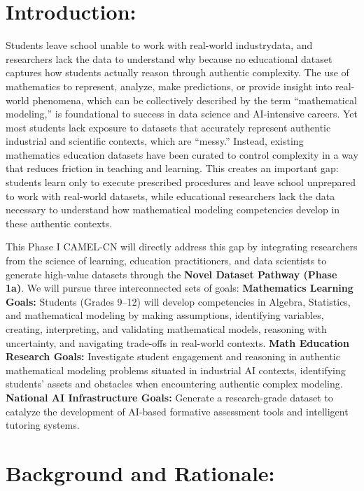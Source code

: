 \documentclass[11pt]{article}
\begin{document}
\section{Introduction:} 
Students leave school unable to work with real-world industrydata, and researchers lack the data to understand why because no educational dataset captures how students actually reason through authentic complexity.
The use of mathematics to represent, analyze, make predictions, or provide insight into real-world phenomena, which can be collectively described by the term ``mathematical modeling,'' is foundational to success in data science and AI-intensive careers.
Yet most students lack exposure to datasets that accurately represent authentic industrial and scientific contexts, which are ``messy.''
Instead, existing mathematics education datasets have been curated to control complexity in a way that reduces friction in teaching and learning.
This creates an important gap: students learn only to execute prescribed procedures and leave school unprepared to work with real-world datasets, while educational researchers lack the data necessary to understand how mathematical modeling competencies develop in these authentic contexts.

This Phase I CAMEL-CN will directly address this gap by integrating researchers from the science of learning, education practitioners, and data scientists to generate high-value datasets through the \textbf{Novel Dataset Pathway (Phase 1a)}.
We will pursue three interconnected sets of goals:
\textbf{Mathematics Learning Goals:} Students (Grades 9–12) will develop competencies in Algebra, Statistics, and mathematical modeling by making assumptions, identifying variables, creating, interpreting, and validating mathematical models, reasoning with uncertainty, and navigating trade-offs in real-world contexts.
\textbf{Math Education Research Goals:} Investigate student engagement and reasoning in authentic mathematical modeling problems situated in industrial AI contexts, identifying students' assets and obstacles when encountering authentic complex modeling.
\textbf{National AI Infrastructure Goals:} Generate a research-grade dataset to catalyze the development of AI-based formative assessment tools and intelligent tutoring systems.


\section{Background and Rationale:}
\end{document}
